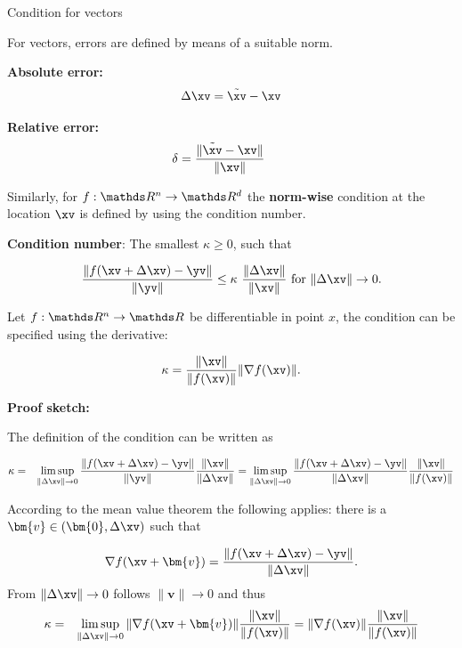 \begin{vbframe}{Condition for vectors}

For vectors, errors are defined by means of a suitable norm.

\lz

\textbf{Absolute error:}
$$
  \Delta \xv = \tilde \xv - \xv
$$

\textbf{Relative error:}
$$
  \delta = \frac{\|\tilde \xv - \xv \|}{\|\xv\|} \qquad
$$

Similarly, for $f:\R^n \rightarrow \R^d$ the \textbf{norm-wise} condition at the location $\xv$ is defined by using the condition number.

\lz

%

\textbf{Condition number}: The smallest $\kappa \geq 0$, such that

$$
\frac{\|f(\xv+\Delta \xv)-\yv\|}{\|\yv\|} \leq \kappa \ \frac{\|\Delta \xv\|}{\|\xv\|} \text{ for } \|\Delta \xv\| \to 0.
$$

Let $f: \R^n \to \R$ be differentiable in point $x$, the condition can be specified using the derivative:

\vspace*{-.3cm}
$$
\kappa =  \frac{\|\xv\|}{\|f(\xv)\|} \|\nabla f(\xv)\|.
$$

\lz
\vspace*{0.5cm}
\begin{footnotesize}
\textbf{Proof sketch:}

The definition of the condition can be written as

\vspace*{-.3cm}
\begin{eqnarray*}
\kappa &=& \limsup_{\|\Delta \xv\| \to 0} \frac{\|f(\xv + \Delta \xv)-\yv\|}{\|\yv\|} \frac{\|\xv\|}{\|\Delta \xv\|}  = \limsup_{\|\Delta \xv\|\to 0} \frac{\|f(\xv + \Delta \xv)-\yv\|}{\|\Delta \xv\|} \frac{\|\xv\|}{\|f(\xv)\|} 
\end{eqnarray*}

According to the mean value theorem the following applies: there is a $\bm{v} \in (\bm{0}, \Delta \xv)$ such that

$$
\nabla f(\xv + \bm{v}) = \frac{\|f(\xv + \Delta \xv)-\yv\|}{\|\Delta \xv\|}.
$$
\vspace*{0.5cm}
From $\|\Delta \xv\| \to 0$ follows $\|\bm{v}\|\to 0$ and thus
\begin{eqnarray*}
\kappa &=& \limsup_{\|\Delta \xv\| \to 0} \|\nabla f(\xv + \bm{v})\| \frac{\|\xv\|}{\|f(\xv)\|} = \|\nabla f(\xv)\| \frac{\|\xv\|}{\|f(\xv)\|}
\end{eqnarray*}
\end{footnotesize}



\end{vbframe}
